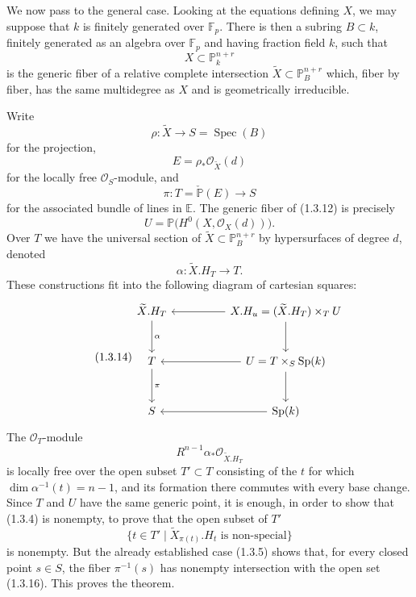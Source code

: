 \par\medskip
We now pass to the general case.  Looking at the equations defining $X$, we
may suppose that $k$ is finitely generated over $\mathbb F_p$.  There is
then a subring $B\subset k$, finitely generated as an algebra over
$\mathbb F_p$ and having fraction field $k$, such that
\begin{equation}\tag{1.3.9}
X\subset\mathbb P_k^{n+r}
\end{equation}
is the generic fiber of a relative complete intersection
$\widetilde X\subset\mathbb P_B^{n+r}$ which, fiber by fiber, has the same
multidegree as $X$ and is geometrically irreducible.

Write
\begin{equation}\tag{1.3.10}
\rho:\widetilde X\longrightarrow S=\operatorname{Spec}(B)
\end{equation}
for the projection,
\begin{equation}\tag{1.3.11}
E=\rho_*\mathcal O_{\widetilde X}(d)
\end{equation}
for the locally free $\mathcal O_S$-module, and
\begin{equation}\tag{1.3.12}
\pi:T=\check{\mathbb P}(E)\longrightarrow S
\end{equation}
for the associated bundle of lines in $\mathbb E$.  The generic fiber of (1.3.12)
is precisely
\[
U=\mathbb P\bigl(H^0(X,\mathcal O_X(d))\bigr).
\]
Over $T$ we have the universal section of
$\widetilde X\subset\mathbb P_B^{n+r}$ by hypersurfaces of degree $d$,
denoted
\begin{equation}\tag{1.3.13}
\alpha:\widetilde X.H_T\longrightarrow T.
\end{equation}
These constructions fit into the following diagram of cartesian squares:
\begin{equation}\tag{1.3.14}
\begin{tikzcd}[column sep=huge,row sep=large]
\widetilde X.H_T \arrow[d,"\alpha"]
  & X.H_u=(\widetilde X.H_T)\times_T U \arrow[l]\arrow[d] \\
T \arrow[d,"\pi"]
  & U=T\times_S\operatorname{Sp}(k) \arrow[l]\arrow[d] \\
S & \operatorname{Sp}(k)\arrow[l]
\end{tikzcd}
\end{equation}
The $\mathcal O_T$-module
\begin{equation}\tag{1.3.15}
R^{n-1}\alpha_*\mathcal O_{\widetilde X.H_T}
\end{equation}
is locally free over the open subset $T'\subset T$ consisting of the
$t$ for which $\dim\alpha^{-1}(t)=n-1$, and its formation there commutes
with every base change.  Since $T$ and $U$ have the same generic point, it
is enough, in order to show that (1.3.4) is nonempty, to prove that the open
subset of $T'$
\begin{equation}\tag{1.3.16}
\bigl\{t\in T'\mid\widetilde X_{\pi(t)}.H_t
   \text{ is non-special}\bigr\}
\end{equation}
is nonempty.  But the already established case (1.3.5) shows that, for
every closed point $s\in S$, the fiber $\pi^{-1}(s)$ has nonempty
intersection with the open set (1.3.16).  This proves the theorem.

